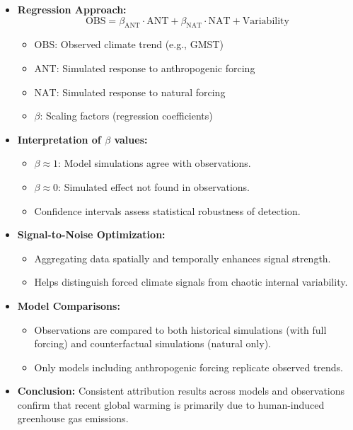 \documentclass[fontsize=8pt, a4paper, landscape, fleqn]{scrartcl}
\begin{document}
\begin{multicols*}{3}[\raggedcolumns]
\begin{itemize}
    \item \textbf{Regression Approach:}
    \[
        \text{OBS} = \beta_\text{ANT} \cdot \text{ANT} + \beta_\text{NAT} \cdot \text{NAT} + \text{Variability}
    \]
    \begin{itemize}
        \item $\text{OBS}$: Observed climate trend (e.g., GMST)
        \item $\text{ANT}$: Simulated response to anthropogenic forcing
        \item $\text{NAT}$: Simulated response to natural forcing
        \item $\beta$: Scaling factors (regression coefficients)
    \end{itemize}
    
    \item \textbf{Interpretation of $\beta$ values:}
    \begin{itemize}
        \item $\beta \approx 1$: Model simulations agree with observations.
        \item $\beta \approx 0$: Simulated effect not found in observations.
        \item Confidence intervals assess statistical robustness of detection.
    \end{itemize}
    
    \item \textbf{Signal-to-Noise Optimization:}
    \begin{itemize}
        \item Aggregating data spatially and temporally enhances signal strength.
        \item Helps distinguish forced climate signals from chaotic internal variability.
    \end{itemize}
    
    \item \textbf{Model Comparisons:}
    \begin{itemize}
        \item Observations are compared to both historical simulations (with full forcing) and counterfactual simulations (natural only).
        \item Only models including anthropogenic forcing replicate observed trends.
    \end{itemize}
    
    \item \textbf{Conclusion:} Consistent attribution results across models and observations confirm that recent global warming is primarily due to human-induced greenhouse gas emissions.
\end{itemize}


\end{multicols*}
\end{document}
